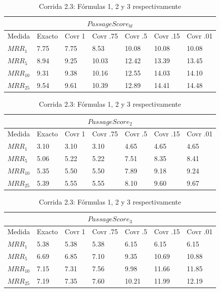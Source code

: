 \begin{table}[H]
\centering
\begin{center}

\begin{tabular}{|l | l | l | l | l | l | l |}
\hline
\multicolumn{7}{|c|}{$PassageScore_{bl}$}  \\ \hline
Medida & Exacto & Covr 1 & Covr .75 & Covr .5 & Covr .15 & Covr .01 \\ \hline
$MRR_{1}$ & 7.75 & 7.75 & 8.53 & 10.08 & 10.08 & 10.08  \\ \hline
$MRR_{5}$ & 8.94 & 9.25 & 10.03 & 12.42 & 13.39 & 13.45  \\ \hline
$MRR_{10}$ & 9.31 & 9.38 & 10.16 & 12.55 & 14.03 & 14.10  \\ \hline
$MRR_{25}$ & 9.54 & 9.61 & 10.39 & 12.89 & 14.41 & 14.48  \\ \hline
\end{tabular}

\medskip

\begin{tabular}{|l | l | l | l | l | l | l |}
\hline
\multicolumn{7}{|c|}{$PassageScore_2$}  \\ \hline
Medida & Exacto & Covr 1 & Covr .75 & Covr .5 & Covr .15 & Covr .01 \\ \hline
$MRR_{1}$ & 3.10 & 3.10 & 3.10 & 4.65 & 4.65 & 4.65  \\ \hline
$MRR_{5}$ & 5.06 & 5.22 & 5.22 & 7.51 & 8.35 & 8.41  \\ \hline
$MRR_{10}$ & 5.35 & 5.50 & 5.50 & 7.89 & 9.18 & 9.24  \\ \hline
$MRR_{25}$ & 5.39 & 5.55 & 5.55 & 8.10 & 9.60 & 9.67  \\ \hline
\end{tabular}


\medskip


\begin{tabular}{|l | l | l | l | l | l | l |}
\hline
\multicolumn{7}{|c|}{$PassageScore_3$}  \\ \hline
Medida & Exacto & Covr 1 & Covr .75 & Covr .5 & Covr .15 & Covr .01 \\ \hline
$MRR_{1}$ & 5.38 & 5.38 & 5.38 & 6.15 & 6.15 & 6.15  \\ \hline
$MRR_{5}$ & 6.69 & 6.85 & 7.10 & 9.35 & 10.69 & 10.88  \\ \hline
$MRR_{10}$ & 7.15 & 7.31 & 7.56 & 9.98 & 11.66 & 11.85  \\ \hline
$MRR_{25}$ & 7.19 & 7.35 & 7.60 & 10.21 & 11.99 & 12.19  \\ \hline
\end{tabular}


\caption{Corrida 2.3: Fórmulas 1, 2 y 3 respectivamente}
\label{table:2_3_40_getExactMRRWikiFactoid_getCovrMRRWikiFactoidq}
\end{center}
\end{table}


